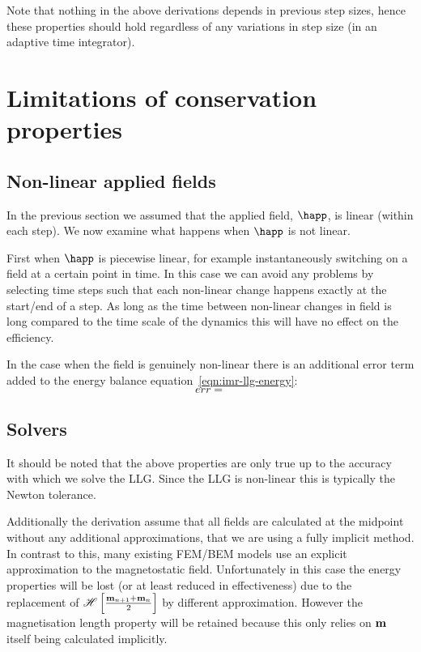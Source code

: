 Note that nothing in the above derivations depends in previous step sizes, hence these properties should hold regardless of any variations in step size (\ie in an adaptive time integrator).


\section{Limitations of conservation properties}

\subsection{Non-linear applied fields}
\label{sec:non-linear-applied}

In the previous section we assumed that the applied field, $\happ$, is linear (within each step).
We now examine what happens when $\happ$ is not linear.

First when $\happ$ is piecewise linear, for example instantaneously switching on a field at a certain point in time.
In this case we can avoid any problems by selecting time steps such that each non-linear change happens exactly at the start/end of a step.
As long as the time between non-linear changes in field is long compared to the time scale of the dynamics this will have no effect on the efficiency.

In the case when the field is genuinely non-linear there is an additional error term added to the energy balance equation~\eqref{eqn:imr-llg-energy}:
\begin{equation}
  err =
\end{equation}






\subsection{Solvers}

It should be noted that the above properties are only true up to the accuracy with which we solve the LLG. Since the LLG is non-linear this is typically the Newton tolerance.

Additionally the derivation assume that all fields are calculated at the midpoint without any additional approximations, \ie that we are using a fully implicit method.
In contrast to this, many existing FEM/BEM models use an explicit approximation to the magnetostatic field.
Unfortunately in this case the energy properties will be lost (or at least reduced in effectiveness) due to the replacement of $\mathscr{H} \left[ \frac{\mathbf{m}_{n+1} + \mathbf{m}_n}{2} \right]$ by different approximation.
However the magnetisation length property will be retained because this only relies on $\mathbf{m}$ itself being calculated implicitly.


